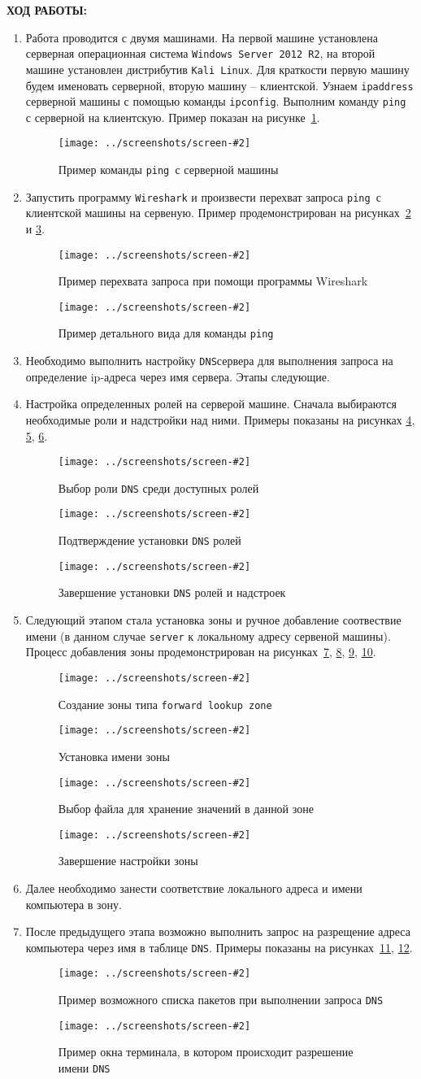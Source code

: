 \documentclass[14pt,a4paper]{extreport}
\newcommand{\screenshot}[2]{\begin{figure}[ht]%
\centering\texttt{[image: ../screenshots/screen-\#2]}%
\caption{#1}%
\label{picture#2}%
\end{figure}%
}
\newcommand{\header}[1]{%
{
\fontsize{16pt}{14pt}\selectfont
\begin{center}
\textbf{\MakeUppercase{#1}:}
\end{center}
}
}
\newcommand{\ping}{\texttt{ping }}
\newcommand{\dns}{\texttt{DNS}}
\begin{document}
\clearpage


\header{Ход работы}

\begin{enumerate}

\item Работа проводится с двумя машинами. На первой машине установлена серверная операционная система \verb|Windows Server 2012 R2|, на второй машине установлен дистрибутив \verb|Kali Linux|. Для краткости первую машину будем именовать серверной, вторую машину -- клиентской. Узнаем \verb|ipaddress| серверной машины с помощью команды \verb|ipconfig|. Выполним команду \ping с серверной на клиентскую. Пример показан на рисунке~\ref{picture1}.

\screenshot{Пример команды \ping с серверной машины}{1}

\item Запустить программу \texttt{Wireshark} и произвести перехват запроса \ping с клиентской машины на сервеную. Пример продемонстрирован на рисунках~\ref{picture2} и \ref{picture3}.

\screenshot{Пример перехвата запроса при помощи программы Wireshark}{2}

\screenshot{Пример детального вида для команды \ping}{3}

\item Необходимо выполнить настройку \dns сервера для выполнения запроса на определение ip-адреса через имя сервера. Этапы следующие.

\item Настройка определенных ролей на серверой машине. Сначала выбираются необходимые роли и надстройки над ними. Примеры показаны на рисунках \ref{picture4}, \ref{picture5}, \ref{picture6}.

\screenshot{Выбор роли \dns {} среди доступных ролей}{4}
\screenshot{Подтверждение установки \dns {} ролей}{5}
\screenshot{Завершение установки \dns {} ролей и надстроек}{6}

\item Следующий этапом стала установка зоны и ручное добавление соотвествие имени (в данном случае \texttt{server} к локальному адресу сервеной машины). Процесс добавления зоны продемонстрирован на рисунках~\ref{picture7}, \ref{picture8}, \ref{picture9}, \ref{picture10}.

\screenshot{Создание зоны типа \texttt{forward lookup zone}}{7}
\screenshot{Установка имени зоны}{8}
\screenshot{Выбор файла для хранение значений в данной зоне}{9}
\screenshot{Завершение настройки зоны}{10}

\item Далее необходимо занести соответствие локального адреса и имени компьютера в зону.

\item После предыдущего этапа возможно выполнить запрос на разрещение адреса компьютера через имя в таблице \dns . Примеры показаны на рисунках~\ref{picture11}, \ref{picture12}.

\screenshot{Пример возможного списка пакетов при выполнении запроса \dns}{11}
\screenshot{Пример окна терминала, в котором происходит разрешение имени \dns}{12}

\end{enumerate}
\end{document}
